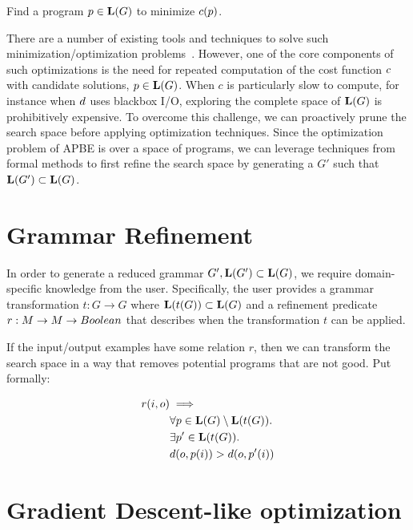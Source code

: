Find a program $p \in \mathbf{L}(G)$ to minimize ${c}(p)$.
\vspace{\baselineskip}

There are a number of existing tools and techniques to solve such minimization/optimization problems~\cite{optmizationTextbook}.
However, one of the core components of such optimizations is the need for repeated computation of the cost function ${c}$ with candidate solutions, $p \in \mathbf{L}(G)$.
When $c$ is particularly slow to compute, for instance when ${d}$ uses blackbox I/O, exploring the complete space of $\mathbf{L}(G)$ is prohibitively expensive.
To overcome this challenge, we can proactively prune the search space before applying optimization techniques.
Since the optimization problem of APBE is over a space of programs, we can leverage techniques from formal methods to first refine the search space by generating a $G'$ such that $\mathbf{L}(G') \subset \mathbf{L}(G)$.

\section{Grammar Refinement}
In order to generate a reduced grammar $G', \mathbf{L}(G') \subset \mathbf{L}(G)$, we require domain-specific knowledge from the user.
Specifically, the user provides a grammar transformation $t:G \to G$ where $\mathbf{L}(t(G)) \subset \mathbf{L}(G)$ 
  and a refinement predicate $r: M \to M \to Boolean$ that describes when the transformation $t$ can be applied. 

If the input/output examples have some relation $r$, then we can transform the search space in a way that removes potential programs that are not good.
Put formally:

\begin{align*}
   r(i,o) &\implies \\
   & \forall p \in \mathbf{L}(G) \setminus \mathbf{L}(t(G)). \\
   & \exists p' \in \mathbf{L}(t(G)). \\
   & {d}(o,p(i)) > {d}(o,p'(i)) 
\end{align*}


\section{Gradient Descent-like optimization}

